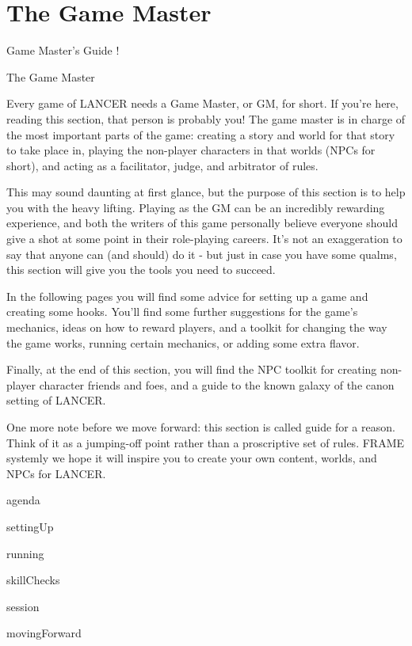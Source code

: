 \chapter{The Game Master}
Game Master’s Guide
!


The Game Master

Every game of LANCER needs a Game Master, or GM, for short. If you’re here, reading this
section, that person is probably you! The game master is in charge of the most important parts of
the game: creating a story and world for that story to take place in, playing the non-player
characters in that worlds (NPCs for short), and acting as a facilitator, judge, and arbitrator of
rules.


This may sound daunting at first glance, but the purpose of this section is to help you with the
heavy lifting. Playing as the GM can be an incredibly rewarding experience, and both the writers
of this game personally believe everyone should give a shot at some point in their role-playing
careers. It’s not an exaggeration to say that anyone can (and should) do it - but just in case you
have some qualms, this section will give you the tools you need to succeed.


In the following pages you will find some advice for setting up a game and creating some
hooks. You’ll find some further suggestions for the game’s mechanics, ideas on how to reward
players, and a toolkit for changing the way the game works, running certain mechanics, or
adding some extra flavor.


Finally, at the end of this section, you will find the NPC toolkit for creating non-player character
friends and foes, and a guide to the known galaxy of the canon setting of LANCER.


One more note before we move forward: this section is called guide for a reason. Think of it as a
jumping-off point rather than a proscriptive set of rules. FRAME systemly we hope it will inspire
you to create your own content, worlds, and NPCs for LANCER.

{agenda}

{settingUp}

{running}

{skillChecks}

{session}

{movingForward}





